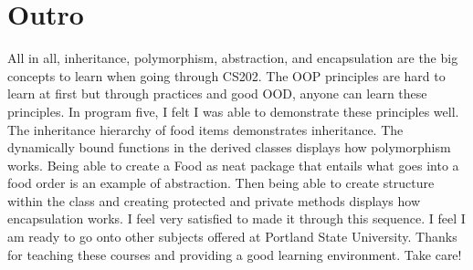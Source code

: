 \documentclass[a4paper,man,biblatex]{apa6}
\begin{document}
\section*{Outro}
All in all, inheritance, polymorphism, abstraction, and encapsulation are the big concepts to learn when going through CS202. The OOP principles are hard to learn at first but through practices and good OOD, anyone can learn these principles. In program five, I felt I was able to demonstrate these principles well. The inheritance hierarchy of food items demonstrates inheritance. The dynamically bound functions in the derived classes displays how polymorphism works. Being able to create a Food as neat package that entails what goes into a food order is an example of abstraction. Then being able to create structure within the class and creating protected and private methods displays how encapsulation works. I feel very satisfied to made it through this sequence. I feel I am ready to go onto other subjects offered at Portland State University. Thanks for teaching these courses and providing a good learning environment. Take care!

\printbibliography
\end{document}
